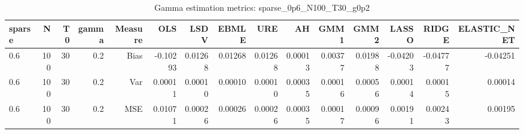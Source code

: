 \begin{table}[!htbp]\centering
\caption{Gamma estimation metrics: sparse_0p6_N100_T30_g0p2}
\label{tab:table1_sparse_0p6_N100_T30_g0p2}
\begin{tabular}{lrrrrrrrrrrrrrr}
\hline
sparse & N & T0 & gamma & Measure & OLS & LSDV & EBMLE & URE & AH & GMM1 & GMM2 & LASSO & RIDGE & ELASTIC_NET \\
\hline
0.6 & 100 & 30 & 0.2 & Bias & -0.10293 & 0.01268 & 0.01268 & 0.01268 & 0.00013 & 0.00377 & 0.01988 & -0.04203 & -0.04777 & -0.04251 \\
0.6 & 100 & 30 & 0.2 & Var & 0.00011 & 0.00010 & 0.00010 & 0.00010 & 0.00035 & 0.00016 & 0.00056 & 0.00014 & 0.00015 & 0.00014 \\
0.6 & 100 & 30 & 0.2 & MSE & 0.01071 & 0.00026 & 0.00026 & 0.00026 & 0.00035 & 0.00017 & 0.00096 & 0.00191 & 0.00243 & 0.00195 \\
\hline
\end{tabular}
\end{table}

